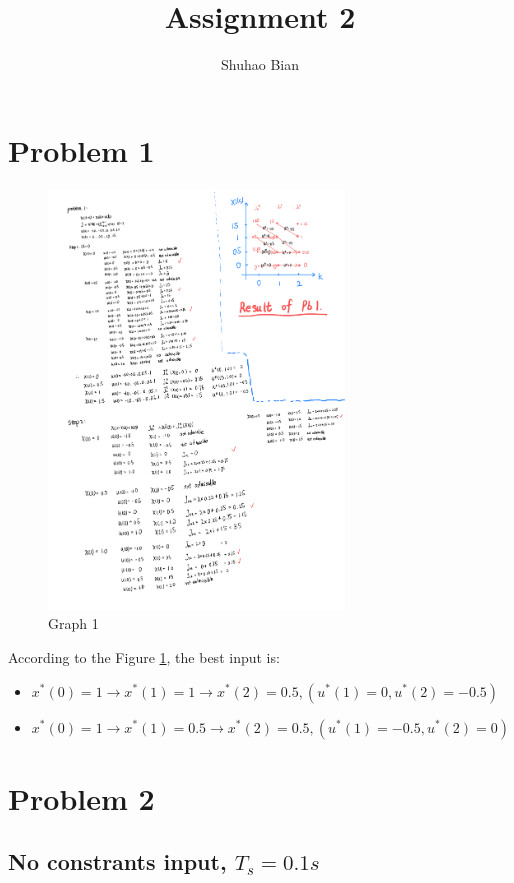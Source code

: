 \documentclass{article}
\title{Assignment 2}
\author{Shuhao Bian}
\begin{document}
\maketitle

\section{Problem 1}

\begin{figure}[h!]
    \centering
    \includegraphics[width=0.7\textwidth]{graph 1.png}
    \caption{Graph 1}\label{fig:pb1graph1}
\end{figure}

According to the Figure \ref{fig:pb1graph1}, the best input is:
\begin{itemize}
    \item $ x^*(0)=1\rightarrow x^*(1)=1\rightarrow x^*(2)=0.5, (u^*(1)=0, u^*(2)=-0.5)$
    \item $ x^*(0)=1\rightarrow x^*(1)=0.5\rightarrow x^*(2)=0.5, (u^*(1)=-0.5, u^*(2)=0)$
\end{itemize}
\newpage
\section{Problem 2}
\subsection{No constrants input, $T_s=0.1s$}
\end{document}
